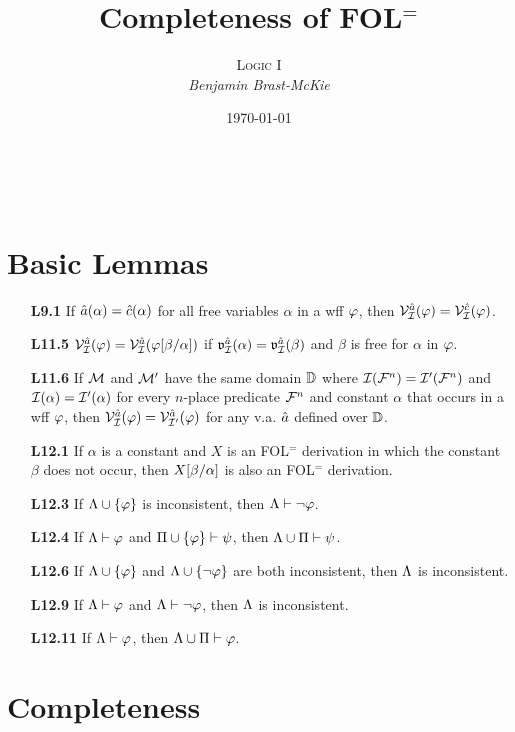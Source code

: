 \documentclass[a4paper, 11pt]{article} %
\title{\textbf{Completeness of FOL$^=$}} %
\author{\textsc{Logic I}\\ \em Benjamin Brast-McKie} %
\date{\today} %
\makeatletter
\renewcommand{\maketitle}{
\begin{flushright}
{\LARGE\@title}

\vspace{10pt}

{\@author}
\\ \@date
\end{flushright}

\vspace{60pt}

}
\makeatother
\begin{document}
\maketitle %

\thispagestyle{empty}



\section*{Basic Lemmas}

\begin{itemize}
  \item[\bf L9.1] If $\hat{a}(\alpha)=\hat{c}(\alpha)$ for all free variables $\alpha$ in a wff $\varphi$, then $\mathcal{V}_{\mathcal{I}}^{\hat{a}}(\varphi)=\mathcal{V}_{\mathcal{I}}^{\hat{c}}(\varphi)$.
  \item[\bf L11.5] $\mathcal{V}_{\mathcal{I}}^{\hat{a}}(\varphi)=\mathcal{V}_{\mathcal{I}}^{\hat{a}}(\varphi[\beta/\alpha])$ if $\mathfrak{v}_{\mathcal{I}}^{\hat{a}}(\alpha)=\mathfrak{v}_{\mathcal{I}}^{\hat{a}}(\beta)$ and $\beta$ is free for $\alpha$ in $\varphi$.
  \item[\bf L11.6] If $\mathcal{M}$ and $\mathcal{M}'$ have the same domain $\mathbb{D}$ where $\mathcal{I}(\mathcal{F}^n)=\mathcal{I}'(\mathcal{F}^n)$ and $\mathcal{I}(\alpha)=\mathcal{I}'(\alpha)$ for every $n$-place predicate $\mathcal{F}^n$ and constant $\alpha$ that occurs in a wff $\varphi$, then $\mathcal{V}_{\mathcal{I}}^{\hat{a}}(\varphi)=\mathcal{V}_{\mathcal{I}'}^{\hat{a}}(\varphi)$ for any v.a. $\hat{a}$ defined over $\mathbb{D}$.
  \item[\bf L12.1] If $\alpha$ is a constant and $X$ is an FOL$^=$ derivation in which the constant $\beta$ does not occur, then $X[\beta/\alpha]$ is also an FOL$^=$ derivation.
  \item[\bf L12.3] If $\Lambda\cup\lbrace\varphi\rbrace$ is inconsistent, then $\Lambda\vdash\neg\varphi$.
  \item[\bf L12.4] If $\Lambda \vdash \varphi$ and $\Pi\cup\lbrace\varphi\rbrace \vdash \psi$, then $\Lambda\cup\Pi \vdash \psi$.
  \item[\bf L12.6] If $\Lambda \cup \lbrace\varphi\rbrace$ and $\Lambda\cup \lbrace\neg\varphi\rbrace$ are both inconsistent, then $\Lambda$ is inconsistent.
  \item[\bf L12.9] If $\Lambda\vdash\varphi$ and $\Lambda\vdash\neg\varphi$, then $\Lambda$ is inconsistent.
  \item[\bf L12.11] If $\Lambda\vdash\varphi$, then $\Lambda\cup\Pi\vdash\varphi$.
\end{itemize}


\section*{Completeness}
\end{document}
